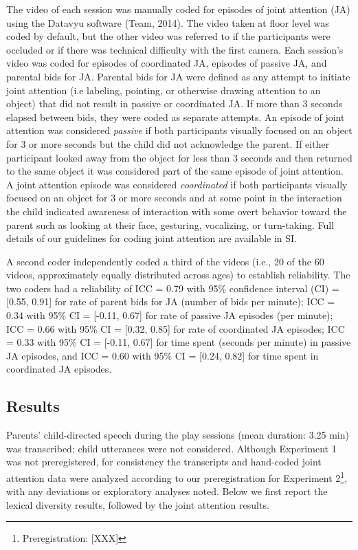 \documentclass[
  english,
  man]{apa6}
\begin{document}
The video of each session was manually coded for episodes of joint attention (JA) using the Datavyu software (Team, 2014).
The video taken at floor level was coded by default, but the other video was referred to if the participants were occluded or if there was technical difficulty with the first camera.
Each session's video was coded for episodes of coordinated JA, episodes of passive JA, and parental bids for JA.
Parental bids for JA were defined as any attempt to initiate joint attention (i.e labeling, pointing, or otherwise drawing attention to an object) that did not result in passive or coordinated JA.
If more than 3 seconds elapsed between bids, they were coded as separate attempts.
An episode of joint attention was considered \emph{passive} if both participants visually focused on an object for 3 or more seconds but the child did not acknowledge the parent.
If either participant looked away from the object for less than 3 seconds and then returned to the same object it was considered part of the same episode of joint attention.
A joint attention episode was considered \emph{coordinated} if both participants visually focused on an object for 3 or more seconds and at some point in the interaction the child indicated awareness of interaction with some overt behavior toward the parent such as looking at their face, gesturing, vocalizing, or turn-taking.
Full details of our guidelines for coding joint attention are available in SI.

A second coder independently coded a third of the videos (i.e., 20 of the 60 videos, approximately equally distributed across ages) to establish reliability.
The two coders had a reliability of ICC = 0.79 with 95\% confidence interval (CI) = {[}0.55, 0.91{]} for rate of parent bids for JA (number of bids per minute); ICC = 0.34 with 95\% CI = {[}-0.11, 0.67{]} for rate of passive JA episodes (per minute); ICC = 0.66 with 95\% CI = {[}0.32, 0.85{]} for rate of coordinated JA episodes; ICC = 0.33 with 95\% CI = {[}-0.11, 0.67{]} for time spent (seconds per minute) in passive JA episodes, and ICC = 0.60 with 95\% CI = {[}0.24, 0.82{]} for time spent in coordinated JA episodes.

\hypertarget{results}{%
\subsection{Results}\label{results}}

Parents' child-directed speech during the play sessions (mean duration: 3.25 min) was transcribed; child utterances were not considered.
Although Experiment 1 was not preregistered, for consistency the transcripts and hand-coded joint attention data were analyzed according to our preregistration for Experiment 2\footnote{Preregistration: {[}XXX{]}}, with any deviations or exploratory analyses noted.
Below we first report the lexical diversity results, followed by the joint attention results.
\end{document}
